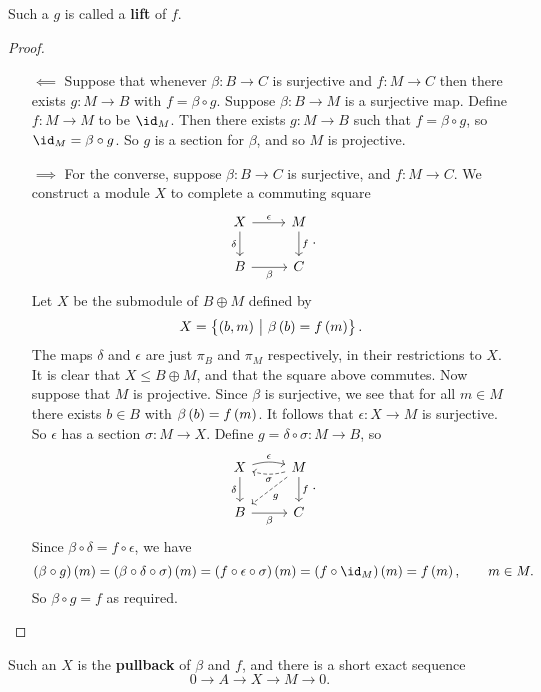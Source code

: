 Such a $ g $ is called a \textbf{lift} of $ f $.

\begin{proof}
\hfill
\begin{itemize}
\item[$ \impliedby $] Suppose that whenever $ \beta : B \to C $ is surjective and $ f : M \to C $ then there exists $ g : M \to B $ with $ f = \beta \circ g $. Suppose $ \beta : B \to M $ is a surjective map. Define $ f : M \to M $ to be $ \id_M $. Then there exists $ g : M \to B $ such that $ f = \beta \circ g $, so $ \id_M = \beta \circ g $. So $ g $ is a section for $ \beta $, and so $ M $ is projective.
\item[$ \implies $] For the converse, suppose $ \beta : B \to C $ is surjective, and $ f : M \to C $. We construct a module $ X $ to complete a commuting square
$$
\begin{tikzcd}
X \arrow{r}{\epsilon} \arrow[swap]{d}{\delta} & M \arrow{d}{f} \\
B \arrow[swap]{r}{\beta} & C
\end{tikzcd}.
$$
Let $ X $ be the submodule of $ B \oplus M $ defined by
$$ X = \cbr{\br{b, m} \st \beta\br{b} = f\br{m}}. $$
The maps $ \delta $ and $ \epsilon $ are just $ \pi_B $ and $ \pi_M $ respectively, in their restrictions to $ X $. It is clear that $ X \le B \oplus M $, and that the square above commutes. Now suppose that $ M $ is projective. Since $ \beta $ is surjective, we see that for all $ m \in M $ there exists $ b \in B $ with $ \beta\br{b} = f\br{m} $. It follows that $ \epsilon : X \to M $ is surjective. So $ \epsilon $ has a section $ \sigma : M \to X $. Define $ g = \delta \circ \sigma : M \to B $, so
$$
\begin{tikzcd}
X \arrow[bend left=15]{r}{\epsilon} \arrow[swap]{d}{\delta} & M \arrow[bend left=15, dashed]{l}{\sigma} \arrow[dashed]{dl}{g} \arrow{d}{f} \\
B \arrow[swap]{r}{\beta} & C
\end{tikzcd}.
$$
Since $ \beta \circ \delta = f \circ \epsilon $, we have
$$ \br{\beta \circ g}\br{m} = \br{\beta \circ \delta \circ \sigma}\br{m} = \br{f \circ \epsilon \circ \sigma}\br{m} = \br{f \circ \id_M}\br{m} = f\br{m}, \qquad m \in M. $$
So $ \beta \circ g = f $ as required.
\end{itemize}
\end{proof}

\pagebreak

Such an $ X $ is the \textbf{pullback} of $ \beta $ and $ f $, and there is a short exact sequence
$$ 0 \to A \to X \to M \to 0. $$

